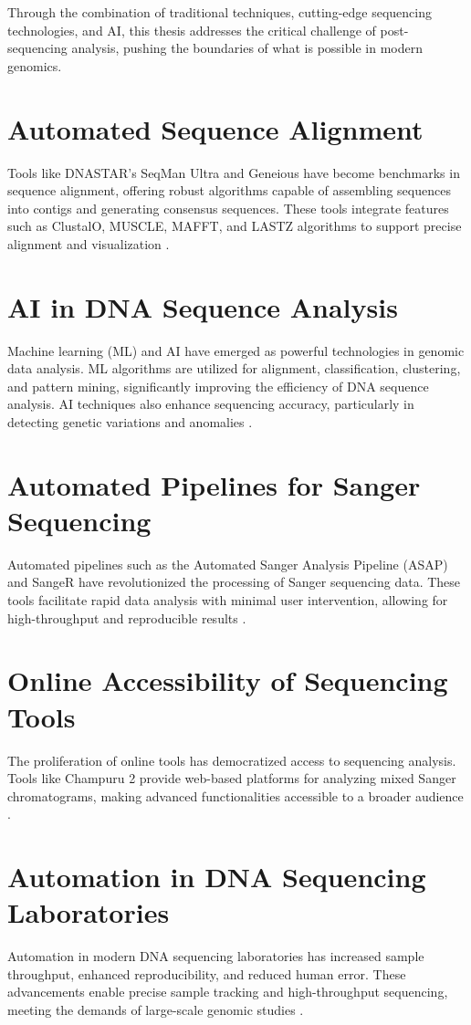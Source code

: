 Through the combination of traditional techniques, cutting-edge sequencing technologies, and AI, this thesis addresses the critical challenge of post-sequencing analysis, pushing the boundaries of what is possible in modern genomics.


\section{Automated Sequence Alignment}
Tools like DNASTAR's SeqMan Ultra and Geneious have become benchmarks in sequence alignment, offering robust algorithms capable of assembling sequences into contigs and generating consensus sequences. These tools integrate features such as ClustalO, MUSCLE, MAFFT, and LASTZ algorithms to support precise alignment and visualization \cite{dnastar,geneious}.

\section{AI in DNA Sequence Analysis}
Machine learning (ML) and AI have emerged as powerful technologies in genomic data analysis. ML algorithms are utilized for alignment, classification, clustering, and pattern mining, significantly improving the efficiency of DNA sequence analysis. AI techniques also enhance sequencing accuracy, particularly in detecting genetic variations and anomalies \cite{frontiers,pmc_ml}.

\section{Automated Pipelines for Sanger Sequencing}
Automated pipelines such as the Automated Sanger Analysis Pipeline (ASAP) and SangeR have revolutionized the processing of Sanger sequencing data. These tools facilitate rapid data analysis with minimal user intervention, allowing for high-throughput and reproducible results \cite{pmc_asap,bioinformaticsadvances}.

\section{Online Accessibility of Sequencing Tools}
The proliferation of online tools has democratized access to sequencing analysis. Tools like Champuru 2 provide web-based platforms for analyzing mixed Sanger chromatograms, making advanced functionalities accessible to a broader audience \cite{champuru2}.

\section{Automation in DNA Sequencing Laboratories}
Automation in modern DNA sequencing laboratories has increased sample throughput, enhanced reproducibility, and reduced human error. These advancements enable precise sample tracking and high-throughput sequencing, meeting the demands of large-scale genomic studies \cite{base4}.
